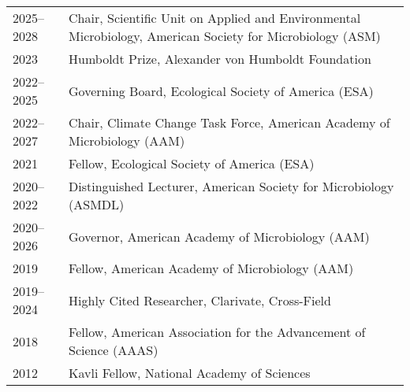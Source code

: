 \documentclass[11pt]{article}  %
\begin{document}
\begin{tabularx}{\textwidth}{@{}l@{\hspace{2em}}X@{}}
2025--2028  & Chair, Scientific Unit on Applied and Environmental Microbiology, American Society for Microbiology (ASM) \\
2023        & Humboldt Prize, Alexander von Humboldt Foundation \\
2022--2025  & Governing Board, Ecological Society of America (ESA) \\
2022--2027  & Chair, Climate Change Task Force, American Academy of Microbiology (AAM) \\
2021        & Fellow, Ecological Society of America (ESA) \\
2020--2022  & Distinguished Lecturer, American Society for Microbiology (ASMDL) \\
2020--2026  & Governor, American Academy of Microbiology (AAM) \\
2019        & Fellow, American Academy of Microbiology (AAM) \\
2019--2024  & Highly Cited Researcher, Clarivate, Cross-Field \\
2018        & Fellow, American Association for the Advancement of Science (AAAS) \\
2012        & Kavli Fellow, National Academy of Sciences \\
\end{tabularx}
\vspace{-1.9em} %
\end{document}
